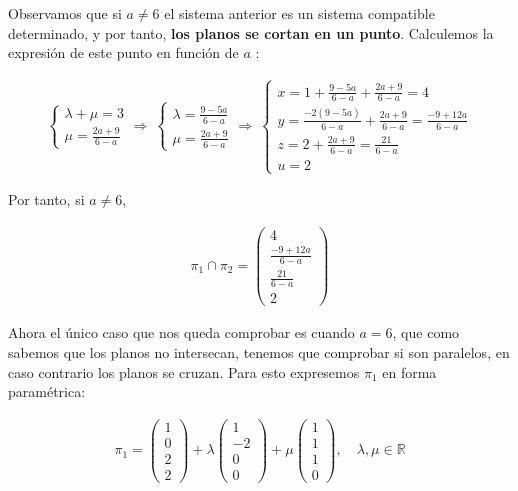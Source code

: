 Observamos que si $a \neq 6$ el sistema anterior es un sistema compatible determinado, y por tanto, \textbf{los planos se cortan en un punto}. Calculemos la expresión de este punto en función de $a$ :

\begin{gather*}
    \begin{cases}
    \lambda + \mu = 3 \\
    \mu = \frac{2a + 9}{6 - a}
    \end{cases}
    \Longrightarrow \
    \begin{cases}
    \lambda = \frac{9 - 5a}{6 - a} \\
    \mu = \frac{2a + 9}{6 - a}
    \end{cases}
    \Longrightarrow \
    \begin{cases}
    x = 1 + \frac{9 - 5a}{6 - a} + \frac{2a + 9}{6 - a} = 4 \\
    y = \frac{-2(9 - 5a)}{6 - a} + \frac{2a + 9}{6 - a} = \frac{-9 + 12a}{6 - a} \\
    z = 2 + \frac{2a + 9}{6 - a} = \frac{21}{6 - a} \\
    u = 2
    \end{cases}
\end{gather*}

Por tanto, si $a \neq 6$, 

\begin{gather*}
    \pi_1 \cap \pi_2 = 
    \begin{pmatrix}
    4 \\ \frac{-9 + 12a}{6- a} \\ \frac{21}{6 - a} \\ 2
    \end{pmatrix}
\end{gather*}

Ahora el único caso que nos queda comprobar es cuando $a = 6$, que como sabemos que los planos no intersecan, tenemos que comprobar si son paralelos, en caso contrario los planos se cruzan. Para esto expresemos $\pi_1$ en forma paramétrica:

\begin{gather*}
    \pi_1 = 
    \begin{pmatrix}
    1 \\ 0 \\ 2 \\ 2
    \end{pmatrix}
    + \lambda
    \begin{pmatrix}
    1 \\ -2 \\ 0 \\ 0
    \end{pmatrix}
    + \mu
    \begin{pmatrix}
    1 \\ 1 \\ 1 \\ 0
    \end{pmatrix}
    , \quad \lambda, \mu \in \mathbb{R}
\end{gather*}

